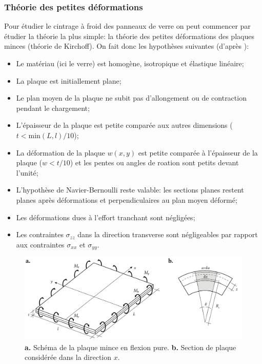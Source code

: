 \documentclass[11pt,titlepage]{article}
\begin{document}
\subsubsection{Théorie des petites déformations}
Pour étudier le cintrage à froid des panneaux de verre on peut commencer par étudier la théorie la plus simple: la théorie des petites déformations des plaques minces (théorie de Kirchoff). On fait donc les hypothèses suivantes (d'après \cite{mcst2}):
\begin{itemize}
    \item Le matériau (ici  le verre) est homogène, isotropique et élastique linéaire;
    \item La plaque est initiallement plane;
    \item Le plan moyen de la plaque ne subit pas d'allongement ou de contraction pendant le chargement;
    \item L'épaisseur de la plaque est petite comparée aux autres dimensions ($t < \text{min}(L,l)/10$);
    \item La déformation de la plaque $w(x,y)$ est petite comparée à l'épaisseur de la plaque ($w < t/10$) et les pentes ou angles de roation sont petits devant l'unité;
    \item L'hypothèse de Navier-Bernoulli reste valable: les sections planes restent planes après déformations et perpendiculaires au plan moyen déformé;
    \item Les déformations dues à l'effort tranchant sont négligées;
    \item Les contraintes $\sigma_{zz}$ dans la direction transverse sont négligeables par rapport aux contraintes $\sigma_{xx}$ et $\sigma_{yy}$.
\end{itemize}

\begin{figure}[H]
    \centering
    \includegraphics[width=\textwidth]{img/cintrage_froid/petitedef.pdf}
    \caption{\textbf{a.} Schéma de la plaque mince en flexion pure. \textbf{b.} Section de plaque considérée dans la direction $x$.}
    \label{fig:petite_def}
\end{figure}
\end{document}
